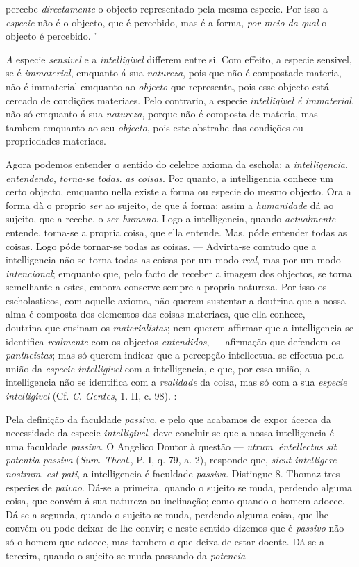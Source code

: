 percebe \emph{directamente} o objecto representado pela mesma especie. Por isso a \emph{especie} não é o objecto, que é percebido, mas é a forma, \emph{por meio da qual} o objecto é percebido. '\par \emph{A} especie \emph{sensivel} e a \emph{intelligivel} differem entre si. Com effeito, a especie sensivel, se é \emph{immaterial}, emquanto á sua \emph{natureza}, pois que não é compostade materia, não é immaterial-emquanto ao \emph{objecto} que representa, pois esse objecto está cercado de condições materiaes. Pelo contrario, a especie \emph{intelligivel é immaterial}, não só emquanto á sua \emph{natureza}, porque não é composta de materia, mas tambem emquanto ao seu \emph{objecto}, pois este abstrahe das condições ou propriedades materiaes.\par Agora podemos entender o sentido do celebre axioma da eschola: a \emph{intelligencia}, \emph{entendendo}, \emph{torna-se todas}. \emph{as coisas}. Por quanto, a intelligencia conhece um certo objecto, emquanto nella existe a forma ou especie do mesmo objecto. Ora a forma dà o proprio \emph{ser} ao sujeito, de que á forma; assim a \emph{humanidade} dá ao sujeito, que a recebe, o \emph{ser humano}. Logo a intelligencia, quando \emph{actualmente} entende, torna-se a propria coisa, que ella entende. Mas, póde entender todas as coisas. Logo póde tornar-se todas as coisas. --- Advirta-se comtudo que a intelligencia não se torna todas as coisas por um modo \emph{real}, mas por um modo \emph{intencional}; emquanto que, pelo facto de receber a imagem dos objectos, se torna semelhante a estes, embora conserve sempre a propria natureza. Por isso os escholasticos, com aquelle axioma, não querem sustentar a doutrina que a nossa alma é composta dos elementos das coisas materiaes, que ella conhece, --- doutrina que ensinam os \emph{materialistas}; nem querem affirmar que a intelligencia se identifica \emph{realmente} com os objectos \emph{entendidos}, --- afirmação que defendem os \emph{pantheistas}; mas só querem indicar que a percepção intellectual se effectua pela união da \emph{especie intelligivel} com a intelligencia, e que, por essa união, a intelligencia não se identifica com a \emph{realidade} da coisa, mas só com a sua \emph{especie intelligivel} (Cf. \emph{C}. \emph{Gentes}, 1. II, c. 98). :\par Pela definição da faculdade \emph{passiva}, e pelo que acabamos de expor ácerca da necessidade da especie \emph{intelligivel}, deve concluir-se que a nossa intelligencia é uma faculdade \emph{passiva}. O Angelico Doutor à questão --- \emph{utrum}. \emph{éntellectus sit potentia passiva} (\emph{Sum}. \emph{Theol}., P. I, q. 79, a. 2), responde que, \emph{sicut intelligere nostrum}. \emph{est pati}, a intelligencia é faculdade \emph{passiva}. Distingue 8. Thomaz tres especies de \emph{paivao}. Dá-se a primeira, quando o sujeito se muda, perdendo alguma coisa, que convém á sua natureza ou inclinação; como quando o homem adoece. Dá-se a segunda, quando o sujeito se muda, perdendo alguma coisa, que lhe convém ou pode deixar de lhe convir; e neste sentido dizemos que é \emph{passivo} não só o homem que adoece, mas tambem o que deixa de estar doente. Dá-se a terceira, quando o sujeito se muda passando da \emph{potencia} 